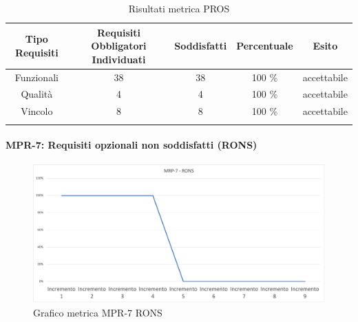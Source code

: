 \begin{center}
    \begin{longtable}{|c|c|c|c|c|}
        \hline
        \rowcolor{lighter-grayer}
        \textbf {Tipo Requisiti} & \textbf{Requisiti Obbligatori Individuati} & \textbf{Soddisfatti} & \textbf{Percentuale} & \textbf{Esito} \\
        \hline
        \endfirsthead

        \hline
        Funzionali & 38 & 38 & 100 \%  & accettabile                \\
        Qualità & 4 & 4 & 100 \% & accettabile                         \\
        Vincolo & 8 & 8 & 100 \% & accettabile                          \\     
        \hline
        \rowcolor{white}
        \caption{Risultati metrica PROS}
    \end{longtable}
\end{center}


\newpage

\paragraph{MPR-7: Requisiti opzionali non soddisfatti (RONS)}\label{_SV}

\begin{center}
        \begin{figure}[!htb]
        \centering
        \includegraphics[scale=0.40]{res/images/ra/RA_RONS.png}
        \caption{Grafico metrica MPR-7 RONS}
    \end{figure}
    \begin{center}
    \end{center}
\end{center}

